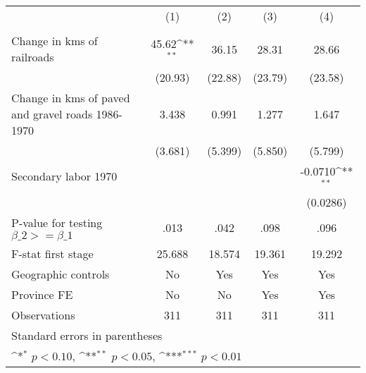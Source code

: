 {
\def\sym#1{\ifmmode^{#1}\else\(^{#1}\)\fi}
\begin{tabular}{l*{4}{c}}
\hline\hline
                &\multicolumn{1}{c}{(1)}&\multicolumn{1}{c}{(2)}&\multicolumn{1}{c}{(3)}&\multicolumn{1}{c}{(4)}\\
                &\multicolumn{1}{c}{}&\multicolumn{1}{c}{}&\multicolumn{1}{c}{}&\multicolumn{1}{c}{}\\
\hline
Change in kms of railroads&    45.62\sym{**} &    36.15         &    28.31         &    28.66         \\
                &  (20.93)         &  (22.88)         &  (23.79)         &  (23.58)         \\
[1em]
Change in kms of paved and gravel roads 1986-1970&    3.438         &    0.991         &    1.277         &    1.647         \\
                &  (3.681)         &  (5.399)         &  (5.850)         &  (5.799)         \\
[1em]
Secondary labor 1970&                  &                  &                  &  -0.0710\sym{**} \\
                &                  &                  &                  & (0.0286)         \\
\hline
P-value for testing $\beta\_{2} >= \beta\_{1}$&     .013         &     .042         &     .098         &     .096         \\
F-stat first stage&   25.688         &   18.574         &   19.361         &   19.292         \\
Geographic controls&       No         &      Yes         &      Yes         &      Yes         \\
Province FE     &       No         &       No         &      Yes         &      Yes         \\
Observations    &      311         &      311         &      311         &      311         \\
\hline\hline
\multicolumn{5}{l}{\footnotesize Standard errors in parentheses}\\
\multicolumn{5}{l}{\footnotesize \sym{*} \(p<0.10\), \sym{**} \(p<0.05\), \sym{***} \(p<0.01\)}\\
\end{tabular}
}
